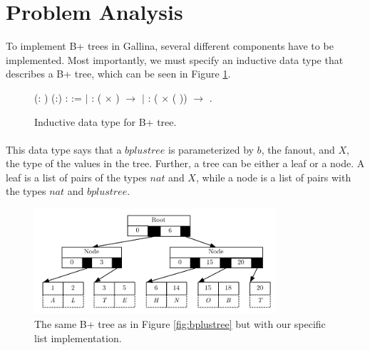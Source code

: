 \section{Problem Analysis}
\label{sec:ProblemAnalysis}
To implement B+ trees in Gallina, several different components have to be implemented. Most importantly, we must specify an inductive data type that describes a B+ tree, which can be seen in Figure \ref{fig:inductive_data_type}.

\begin{figure}
\centering
\begin{coqdoccode}
  (: ) (:) :  :=\coqdoceol
\coqdocindent{1.00em}
\ensuremath{|}  :  ( \ensuremath{\times} ) \ensuremath{\rightarrow}   \coqdoceol
\coqdocindent{1.00em}
\ensuremath{|}  :  ( \ensuremath{\times} (  )) \ensuremath{\rightarrow}   .\coqdoceol
\end{coqdoccode}
\caption{Inductive data type for B+ tree.}
\label{fig:inductive_data_type}
\end{figure}

\paragraph{}
This data type says that a $bplustree$ is parameterized by $b$, the fanout, and $X$, the type of the values in the tree. Further, a tree can be either a leaf or a node. A leaf is a list of pairs of the types $nat$ and $X$, while a node is a list of pairs with the types $nat$ and $bplustree$. 

\begin{figure}
 \centering
   \includegraphics[width=90mm]{diagrams/BPlusTreeImpl.pdf}
 \caption{The same B+ tree as in Figure \ref{fig:bplustree} but with our specific list implementation.}
 \label{fig:bplustreeImpl}
\end{figure}

